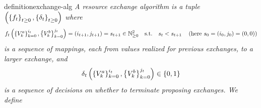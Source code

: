 \begin{restatable}[Algorithm]{definition}{exchange-alg}
    \label{def:exchange-alg}
    \emph{A resource exchange algorithm is a tuple
    \(
        \left(
            \left\{
                f_{t}
            \right\}_{t\geq 0}, 
            \left\{
                \delta_{t}
            \right\}_{t\geq 0}
        \right)
    \)
    where
    \begin{align*}
        f_{t}\left(
            \left\{
                V^a_{
                    k
                }
            \right\}_{k=0}^{
                i_{t}
            },
            \left\{
                V^b_{
                    k
                }
            \right\}_{k=0}^{
                j_{t}
            }
        \right)
        =
        \left(
            i_{t+1},
            j_{t+1}
        \right)
        =
        s_{t+1}
        \in\mathbb{N}^2_{\geq 0}
        \quad
        \text{s.t.}
        \quad
        s_{t}
        <
        s_{t+1}
        \quad
        \left(
            \text{here }
            s_{0}
            =
            \left(
                i_{0},j_{0}
            \right)
            =
            (0,0)
        \right)
    \end{align*}     
    is a sequence of 
    mappings, each from values realized for previous exchanges, to a larger exchange,
    and
    \[
        \delta_{t}
        \left(
            \left\{
                V^a_{
                    k
                }
            \right\}_{k=0}^{
                i_{t}
            },
            \left\{
                V^b_{
                    k
                }
            \right\}_{k=0}^{
                j_{t}
            }
        \right)
        \in\left\{0,1\right\}
    \]
    is a 
    sequence of decisions on whether to terminate proposing exchanges.
    We define
}
\end{restatable}

